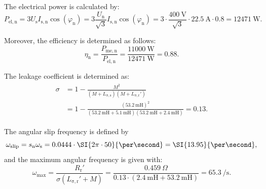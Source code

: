 
\begin{solutionblock}
    The electrical power is calculated by:
    $$ P_{\mathrm{el,n}} = 3 U_{\mathrm{s}} I_{\mathrm{s,n}} \cos(\varphi_{\mathrm{n}}) = 3 \frac{U_{\mathrm{n}}}{\sqrt{3}} I_{\mathrm{s,n}} \cos(\varphi_{\mathrm{n}}) =  3 \cdot \frac{\SI{400}{\volt}}{\sqrt{3}} \cdot \SI{22,5}{\ampere} \cdot 0.8 = \SI{12471}{\watt}.$$

    Moreover, the efficiency is determined as follows:
    $$ \eta_{\mathrm{n}} = \frac{P_{\mathrm{me,n}}}{P_{\mathrm{el,n}}} = \frac{\SI{11000}{\watt}}{\SI{12471}{\watt}} = 0.88.$$

\end{solutionblock}


\begin{solutionblock}
    The leakage coefficient is determined as:
    \begin{align*}
        \begin{split}
            \sigma &=  1 - \frac{M^2}{\left(M+L_{\mathrm{\sigma,s}}\right)\left(M+L_{\mathrm{\sigma,r}}'\right)} \\
            &= 1 - \frac{\left(\SI{53.2}{\milli\henry}\right)^2}{\left(\SI{53.2}{\milli\henry}+ \SI{5.1}{\milli\henry}\right)\left(\SI{53.2}{\milli\henry}+ \SI{2.4}{\milli\henry}\right)} = 0.13.
        \end{split}
    \end{align*}
\end{solutionblock}


\begin{solutionblock}
    The angular slip frequency is defined by
    $$ \omega_{\mathrm{slip}} = s_{\mathrm{n}} \omega_{\mathrm{s}} = 0.0444 \cdot \SI{2\pi \cdot 50}{\per\second} = \SI{13.95}{\per\second},$$
    and the maximum angular frequency is given with:
    $$ \omega_{\mathrm{max}} = \frac{R_{\mathrm{r}}'}{\sigma \left(L_{\mathrm{\sigma,r}}' + M\right)} = \frac{\SI{0.459}{\Omega}}{0.13\cdot \left(\SI{2.4}{\milli\henry} + \SI{53.2}{\milli\henry}\right)} = \SI{65.3}{\per\second}. $$

\end{solutionblock}

